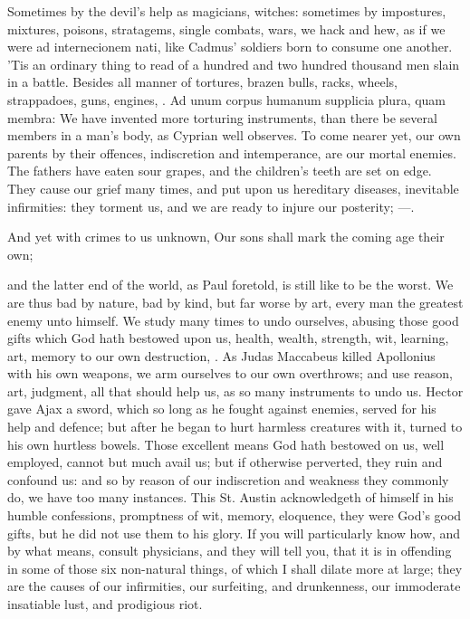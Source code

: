 {Sometimes by the devil's help as magicians, witches: sometimes by
impostures, mixtures, poisons, stratagems, single combats, wars, we
hack and hew, as if we were ad internecionem nati, like Cadmus'
soldiers born to consume one another. 'Tis an ordinary thing to read of
a hundred and two hundred thousand men slain in a battle. Besides all
manner of tortures, brazen bulls, racks, wheels, strappadoes, guns,
engines, \etc{}. Ad unum corpus humanum supplicia plura, quam membra:
We have invented more torturing instruments, than there be several
members in a man's body, as Cyprian well observes. To come nearer yet,
our own parents by their offences, indiscretion and intemperance, are
our mortal enemies. The fathers have eaten sour grapes, and the
children's teeth are set on edge. They cause our grief many times, and
put upon us hereditary diseases, inevitable infirmities: they torment
us, and we are ready to injure our posterity;
---.

And yet with crimes to us unknown,
Our sons shall mark the coming age their own;

and the latter end of the world, as Paul foretold, is still like
to be the worst. We are thus bad by nature, bad by kind, but far worse
by art, every man the greatest enemy unto himself. We study many times
to undo ourselves, abusing those good gifts which God hath bestowed
upon us, health, wealth, strength, wit, learning, art, memory to our
own destruction, . As Judas Maccabeus
killed Apollonius with his own weapons, we arm ourselves to our own
overthrows; and use reason, art, judgment, all that should help us, as
so many instruments to undo us. Hector gave Ajax a sword, which so long
as he fought against enemies, served for his help and defence; but
after he began to hurt harmless creatures with it, turned to his own
hurtless bowels. Those excellent means God hath bestowed on us, well
employed, cannot but much avail us; but if otherwise perverted, they
ruin and confound us: and so by reason of our indiscretion and weakness
they commonly do, we have too many instances. This St. Austin
acknowledgeth of himself in his humble confessions, promptness of wit,
memory, eloquence, they were God's good gifts, but he did not use them
to his glory. If you will particularly know how, and by what means,
consult physicians, and they will tell you, that it is in offending in
some of those six non-natural things, of which I shall dilate more
at large; they are the causes of our infirmities, our surfeiting, and
drunkenness, our immoderate insatiable lust, and prodigious riot.

}
